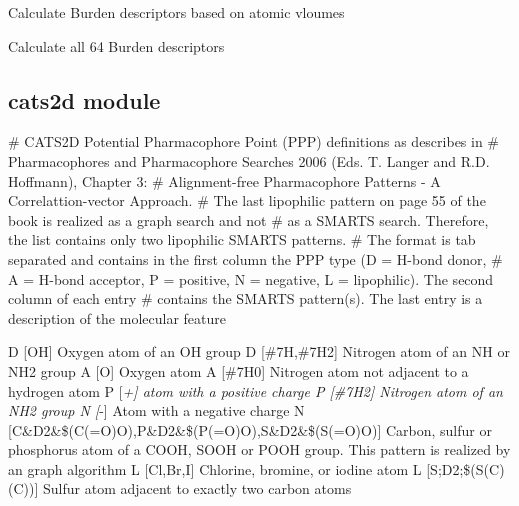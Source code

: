 \documentclass[letterpaper,10pt,english]{sphinxmanual}
\begin{document}

\begin{fulllineitems}
\label{reference/bcut:bcut.CalculateBurdenVDW}
Calculate Burden descriptors based on atomic vloumes

\end{fulllineitems}


\begin{fulllineitems}
\label{reference/bcut:bcut.GetBurden}
Calculate all 64 Burden descriptors

\end{fulllineitems}



\subsection{cats2d module}
\label{reference/cats2d::doc}\label{reference/cats2d:module-cats2d}\label{reference/cats2d:cats2d-module}
\# CATS2D  Potential Pharmacophore Point (PPP) definitions as describes in
\# Pharmacophores and Pharmacophore Searches 2006 (Eds. T. Langer and R.D. Hoffmann), Chapter 3:
\# Alignment-free Pharmacophore Patterns - A Correlattion-vector Approach.
\# The last lipophilic pattern on page 55 of the book is realized as a graph search and not
\# as a SMARTS search. Therefore, the list contains only two lipophilic SMARTS patterns.
\# The format is tab separated and contains in the first column the PPP type (D = H-bond donor,
\# A = H-bond acceptor, P = positive, N = negative, L = lipophilic). The second column of each entry
\# contains the SMARTS pattern(s). The last entry is a description of the molecular feature

D       {[}OH{]}    Oxygen atom of an OH group
D       {[}\#7H,\#7H2{]}      Nitrogen atom of an NH or NH2 group
A       {[}O{]}     Oxygen atom
A       {[}\#7H0{]}  Nitrogen atom not adjacent to a hydrogen atom
P       {[}\emph{+{]}    atom with a positive charge
P       {[}\#7H2{]}  Nitrogen atom of an NH2 group
N       {[}}-{]}    Atom with a negative charge
N       {[}C\&D2\&\$(C(=O)O),P\&D2\&\$(P(=O)O),S\&D2\&\$(S(=O)O){]}  Carbon, sulfur or phosphorus atom of a COOH, SOOH or POOH group. This pattern is realized by an graph algorithm
L       {[}Cl,Br,I{]}       Chlorine, bromine, or iodine atom
L       {[}S;D2;\$(S(C)(C)){]}       Sulfur atom adjacent to exactly two carbon atoms
\end{document}
